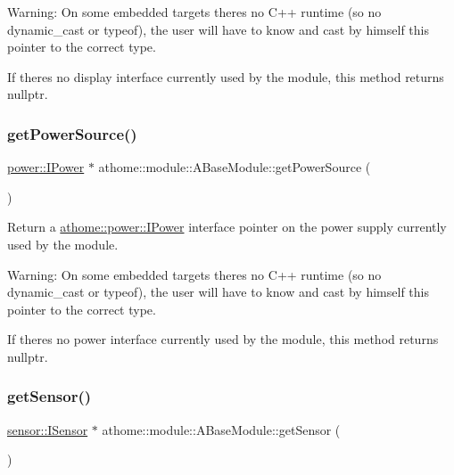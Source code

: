 Warning\+: On some embedded targets there\textquotesingle{}s no C++ runtime (so no {\ttfamily dynamic\+\_\+cast} or {\ttfamily typeof}), the user will have to know and cast by himself this pointer to the correct type.

If there\textquotesingle{}s no display interface currently used by the module, this method returns {\ttfamily nullptr}. \mbox{\label{classathome_1_1module_1_1_a_base_module_a3152f721f953e32a1f965856936d188e}} 
\subsubsection{\texorpdfstring{get\+Power\+Source()}{getPowerSource()}}
{\footnotesize\ttfamily \mbox{\hyperlink{classathome_1_1power_1_1_i_power}{power\+::\+I\+Power}} $\ast$ athome\+::module\+::\+A\+Base\+Module\+::get\+Power\+Source (\begin{DoxyParamCaption}{ }\end{DoxyParamCaption})}

Return a \mbox{\hyperlink{classathome_1_1power_1_1_i_power}{athome\+::power\+::\+I\+Power}} interface pointer on the power supply currently used by the module.

Warning\+: On some embedded targets there\textquotesingle{}s no C++ runtime (so no {\ttfamily dynamic\+\_\+cast} or {\ttfamily typeof}), the user will have to know and cast by himself this pointer to the correct type.

If there\textquotesingle{}s no power interface currently used by the module, this method returns {\ttfamily nullptr}. \mbox{\label{classathome_1_1module_1_1_a_base_module_abd4cf0d059639c4d09f35d7b1ddd2b4e}} 
\subsubsection{\texorpdfstring{get\+Sensor()}{getSensor()}}
{\footnotesize\ttfamily \mbox{\hyperlink{classathome_1_1sensor_1_1_i_sensor}{sensor\+::\+I\+Sensor}} $\ast$ athome\+::module\+::\+A\+Base\+Module\+::get\+Sensor (\begin{DoxyParamCaption}{ }\end{DoxyParamCaption})}

